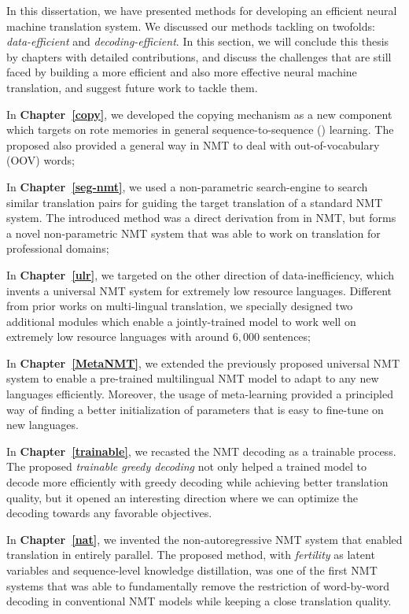 In this dissertation, we have presented methods for developing an efficient neural machine translation system. 
We discussed  our methods tackling on twofolds: {\it data-efficient} and {\it decoding-efficient}.
In this section, we will conclude this thesis by chapters with detailed contributions, and discuss the challenges that are still faced by building a more efficient and also more effective neural machine translation, and suggest future work to tackle them.

In \textbf{Chapter~\ref{copy}}, we developed the copying mechanism as a new component  which targets on rote memories in general sequence-to-sequence (\sts) learning. The proposed \copynet also provided a general way in NMT to deal with out-of-vocabulary (OOV) words; 

In \textbf{Chapter~\ref{seg-nmt}}, we used a non-parametric search-engine to search similar translation pairs for guiding the target translation of a standard NMT system. The introduced method was a direct derivation from \copynet in NMT, but forms a novel non-parametric NMT system that was able to work on translation for professional domains; 

In \textbf{Chapter~\ref{ulr}}, we targeted on the other direction of data-inefficiency, which invents a universal NMT system for extremely low resource languages. Different from prior works on multi-lingual translation, we specially designed two additional modules which enable a jointly-trained model to work well on extremely low resource languages with around $6,000$ sentences; 

In \textbf{Chapter~\ref{MetaNMT}}, we extended the previously proposed universal NMT system to enable a pre-trained multilingual NMT model to adapt to any new languages efficiently. Moreover, the usage of meta-learning provided a principled way of finding a better initialization of parameters that is easy to fine-tune on new languages.


In \textbf{Chapter~\ref{trainable}}, we recasted the NMT decoding as a trainable process. The proposed {\it trainable greedy decoding} not only helped a trained model to decode more efficiently with greedy decoding while achieving better translation quality, but it opened an interesting direction where we can optimize the decoding towards any favorable objectives.

In \textbf{Chapter~\ref{nat}}, we invented the non-autoregressive NMT system that enabled translation in entirely parallel. The proposed method, with {\it fertility} as latent variables and sequence-level knowledge distillation, was one of the first NMT systems that was able to fundamentally remove the restriction of word-by-word decoding in conventional NMT models while keeping a close translation quality.


